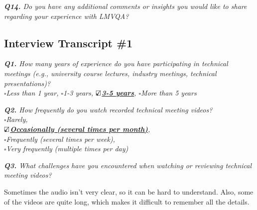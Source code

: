 \vspace*{1em}
\noindent\textit{\textbf{Q14.} Do you have any additional comments or insights you would like to share regarding your experience with LMVQA?
}



%

\vspace*{.6cm}


\noindent\hrulefill 

\newpage
\subsection{Interview Transcript \#1}
\label{appendix:transcript1}


\vspace*{1em}\noindent\textit{\textbf{Q1.} How many years of experience do you have participating in technical meetings (e.g., university course lectures, industry meetings, technical presentations)?
\\[.5em]
        \indent $\square$Less than 1 year,
        $\square$1-3 years,
        \underline{\bfseries$\text{\rlap{$\checkmark$}}\square$3-5 years},
        $\square$More than 5 years
}


\vspace*{1em}\noindent\textit{\textbf{Q2.} How frequently do you watch recorded technical meeting videos?
\\[.5em]
        \indent $\square$Rarely,\\
        \indent\underline{\bfseries$\text{\rlap{$\checkmark$}}\square$Occasionally (several times per month)},\\
        \indent$\square$Frequently (several times per week),\\
        \indent$\square$Very frequently (multiple times per day)
}

\vspace*{1em}\noindent\textit{\textbf{Q3.} What challenges have you encountered when watching or reviewing technical meeting videos? 
}

\begin{samepage}
\begin{mdframed}[style=MyFrame]
Sometimes the audio isn’t very clear, so it can be hard to understand. Also, some of the videos are quite long, which makes it difficult to remember all the details.
\end{mdframed}
\end{samepage}


